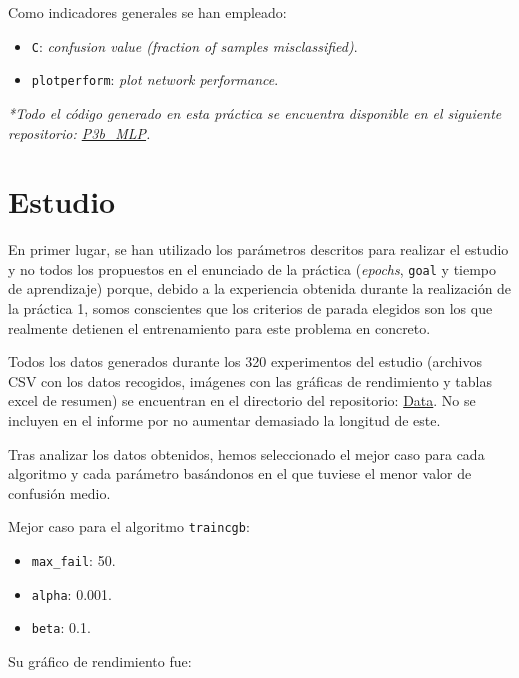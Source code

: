 \documentclass[a4paper,12pt,titlepage]{article}
\begin{document}
Como indicadores generales se han empleado:

\begin{itemize}[noitemsep]
	\item \lstinline|C|: \textit{confusion value (fraction of samples misclassified)}.
	\item \lstinline|plotperform|: \textit{plot network performance}. \citep{matlab:plotperform}
\end{itemize}

\emph{*Todo el código generado en esta práctica se encuentra disponible en el siguiente repositorio: 
\href{https://github.com/davidmigloz/neuronal-networks/tree/master/P3b\_MLP/}{P3b\_MLP}.}

\section{Estudio}

En primer lugar, se han utilizado los parámetros descritos para realizar el estudio y no todos los propuestos en el enunciado de la práctica (\textit{epochs}, \lstinline|goal| y tiempo de aprendizaje) porque, debido a la experiencia obtenida durante la realización de la práctica 1, somos conscientes que los criterios de parada elegidos son los que realmente detienen el entrenamiento para este problema en concreto.

Todos los datos generados durante los 320 experimentos del estudio (archivos CSV con los datos recogidos, imágenes con las gráficas de rendimiento y tablas excel de resumen) se encuentran en el directorio del repositorio: \href{https://github.com/davidmigloz/neuronal-networks/tree/master/P3b\_MLP/data}{Data}. No se incluyen en el informe por no aumentar demasiado la longitud de este.

Tras analizar los datos obtenidos, hemos seleccionado el mejor caso para cada algoritmo y cada parámetro basándonos en el que tuviese el menor valor de confusión medio.

Mejor caso para el algoritmo \lstinline|traincgb|:

\begin{itemize}[noitemsep]
	\item \lstinline|max_fail|: 50.
	\item \lstinline|alpha|: 0.001.
	\item \lstinline|beta|: 0.1.
\end{itemize}

Su gráfico de rendimiento fue:
\end{document}
